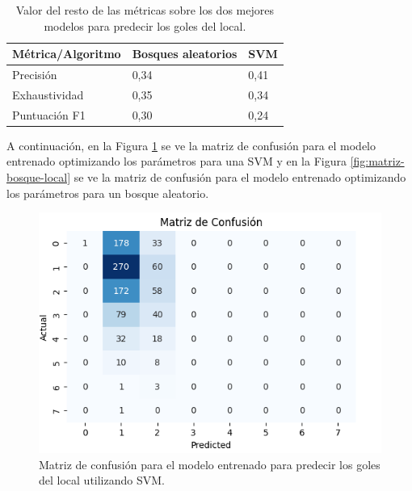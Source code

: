 \begin{table}[]
    \centering
    \begin{tabular}{|l|l|l|}
        \hline
        \rowcolor[HTML]{C0C0C0}
        Métrica/Algoritmo   & Bosques aleatorios & SVM  \\ \hline
        Precisión & 0,34               & 0,41 \\ \hline
        Exhaustividad    & 0,35               & 0,34 \\ \hline
        Puntuación F1  & 0,30               & 0,24 \\ \hline
    \end{tabular}
    \caption{Valor del resto de las métricas sobre los dos mejores modelos para predecir los goles del local.}
    \label{table:resto-metricas-local}
\end{table}

A continuación, en la Figura \ref{fig:matriz-svm-local} se ve la matriz de confusión para el modelo entrenado optimizando los parámetros para una SVM y en la Figura \ref{fig:matriz-bosque-local} se ve la matriz de confusión para el modelo entrenado optimizando los parámetros para un bosque aleatorio.

\begin{figure}[H]
    \centering
    \includegraphics[scale=0.60]{svg/matriz-svm-local.png}
    \caption{Matriz de confusión para el modelo entrenado para predecir los goles del local utilizando SVM. }
    \label{fig:matriz-svm-local}
\end{figure}

